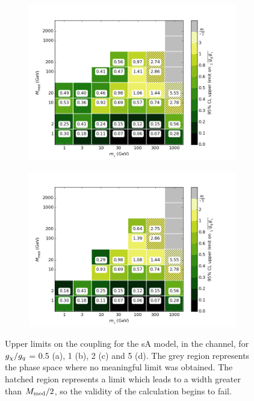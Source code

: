 \begin{figure}[h]
\begin{subfigure}[t]{0.45\textwidth}
      \includegraphics[width=1.\textwidth]{figures/grid_allpoints_SAD_rat2.png}
      \caption{}
    \end{subfigure}
    \begin{subfigure}[t]{0.45\textwidth}
      \centering
      \includegraphics[width=1.\textwidth]{figures/grid_allpoints_SAD_rat5.png}
      \caption{}
    \end{subfigure}
    \caption{Upper limits on the coupling for the sA model, in the \monoZ channel, for $g_{\chi} / g_q$ = 0.5 (a), 1 (b), 2 (c) and 5 (d). The grey region represents the phase space where no meaningful limit was obtained. The hatched region represents a limit which leads to a width greater than $M_{\mathrm{med}} / 2$, so the validity of the calculation begins to fail.}
    \label{fig:MonoZ_SAD_couplinglimit}
\end{figure}

